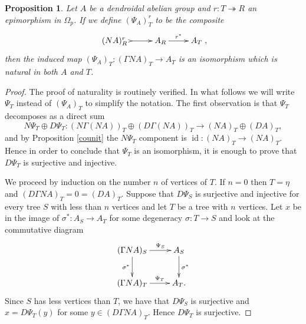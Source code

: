 \documentclass[a4paper]{amsart}
\theoremstyle{plain}
\newtheorem{prop}[thm]{Proposition}
\theoremstyle{definition}
\theoremstyle{remark}
\DeclareMathOperator{\id}{id}
\newcommand{\rpd}{\Omega_p}
\newcommand{\To}{\longrightarrow}
\numberwithin{equation}{section}
\numberwithin{figure}{section}
\begin{document}
\begin{prop}\label{unit}
    Let $A$ be a dendroidal abelian group and $r\colon T\twoheadrightarrow R$ an epimorphism in $\rpd$. If we define $(\Psi_A)_T^r$ to be the composite
    \[
        \xymatrix{(NA)_R^r\ \ar@{>->}[r] &A_R\ar[r]^-{r^*} &A_T},
    \]
    then the induced map $(\Psi_A)_T\colon(\Gamma NA)_T\To A_T$ is an isomorphism which is natural in both $A$ and $T$.
\end{prop}
\begin{proof}
    The proof of naturality is routinely verified. In what follows we will write $\Psi_T$ instead of $(\Psi_A)_T$ to simplify the notation. The first observation is that $\Psi_T$ decomposes as a direct sum
    \[
        N\Psi_T\oplus D\Psi_T\colon (N\Gamma (NA))_T\oplus (D\Gamma (NA))_T\To (NA)_T\oplus (DA)_T,
    \]
    and by Proposition \ref{counit} the $N\Psi_T$ component is $\id\colon (NA)_T\To (NA)_T$. Hence in order to conclude that $\Psi_T$ is an isomorphism, it is enough to prove that $D\Psi_T$ is surjective and injective.

    We proceed by induction on the number $n$ of vertices of $T$. If $n=0$ then $T=\eta$ and $(D\Gamma NA)_T=0=(DA)_T$.
    Suppose that $D\Psi_S$ is surjective and injective for every tree $S$ with less than $n$ vertices and let $T$ be a tree with $n$ vertices.
    Let $x$ be in the image of $\sigma^*\colon A_S\To A_T$  for some degeneracy $\sigma\colon T\To S$ and look at the commutative diagram
    \[
        \xymatrix{(\Gamma N A)_S\ar[r]^-{\Psi_S}\ar[d]_{\sigma^*} & A_S\ar[d]^{\sigma^*}\\
        (\Gamma N A)_T\ar[r]^-{\Psi_T} &A_T.}
    \]
    Since $S$ has less vertices than $T$, we have that $D\Psi_S$ is surjective and $x=D\Psi_T(y)$ for some $y\in(D\Gamma N A)_T$. Hence $D\Psi_T$ is surjective.


\end{proof}
\end{document}
